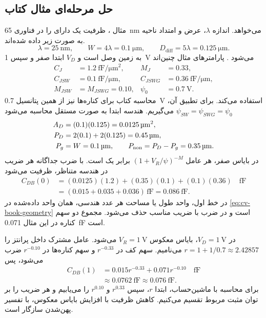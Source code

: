 \subsection{حل مرحله‌ای مثال \texorpdfstring{}{۲.۲} کتاب}
مثال ، ظرفیت  یک  دارای  را
در فناوری \qty{65}{\nano\metre} می‌خواهد. اندازه \(\lambda\)، عرض و امتداد
ناحیه به صورت زیر داده شده‌اند.
\[
 \lambda=\qty{25}{\nano\metre},\qquad
 W=4\lambda=\qty{0.1}{\micro\metre},\qquad
 D_{\mathrm{diff}}=5\lambda=\qty{0.125}{\micro\metre}.
\]
 به زمین وصل است و \(V_D\) ابتدا صفر و سپس \qty{1}{\volt} می‌شود
\cite[صفحه ۷۳]{weste}.
پارامترهای مثال چنین‌اند
\begin{align*}
 C_J&=\qty{1.2}{\femto\farad\per\micro\metre\squared},
 &M_J&=0.33,\\
 C_{JSW}&=\qty{0.1}{\femto\farad\per\micro\metre},
 &C_{JSWG}&=\qty{0.36}{\femto\farad\per\micro\metre},\\
 M_{JSW}&=M_{JSWG}=0.10,
 &\psi_0&=\qty{0.7}{\volt}.
\end{align*}
محاسبه کتاب برای کناره‌ها نیز از همین پتانسیل \qty{0.7}{\volt} استفاده می‌کند.
برای تطبیق آن، \(\psi_{SW}=\psi_{SWG}=\psi_0\) می‌گیریم.
هندسه ابتدا به صورت مستقل محاسبه می‌شود
\begin{align}
 A_D&=(0.1)(0.125)=\qty{0.0125}{\micro\metre\squared},\notag\\
 P_D&=2(0.1)+2(0.125)=\qty{0.45}{\micro\metre},\notag\\
 P_g&=W=\qty{0.1}{\micro\metre},\qquad
 P_{\mathrm{non}}=P_D-P_g=\qty{0.35}{\micro\metre}.
 \label{eq:cv-book-geometry}
\end{align}
در بایاس صفر، هر عامل \((1+V_R/\psi)^{-M}\) برابر یک است. با ضرب جداگانه هر
ضریب در هندسه متناظر، ظرفیت می‌شود
\begin{align*}
 C_{DB}(0)
 &=(0.0125)(1.2)+(0.35)(0.1)+(0.1)(0.36)\quad\unit{\femto\farad}\\
 &=(0.015+0.035+0.036)\,\unit{\femto\farad}
 =\qty{0.086}{\femto\farad}.
\end{align*}
در خط اول، واحد طول یا مساحت هر عدد هندسی، همان واحد داده‌شده در
\eqref{eq:cv-book-geometry} است و در ضرب با ضریب مناسب حذف می‌شود.
مجموع دو سهم کناره در این مثال \qty{0.071}{\femto\farad} است.

در \(V_D=\qty{1}{\volt}\)، بایاس معکوس \(V_R=\qty{1}{\volt}\) می‌شود.
عامل مشترک داخل پرانتز را \(r=1+1/0.7\approx2.42857\) می‌نامیم.
سهم کف در \(r^{-0.33}\) و سهم کناره‌ها در \(r^{-0.10}\) ضرب می‌شود، پس
\begin{align*}
 C_{DB}(1)
 &=0.015r^{-0.33}+0.071r^{-0.10}\quad\unit{\femto\farad}\\
 &\approx\qty{0.0762}{\femto\farad}\approx\qty{0.076}{\femto\farad}.
\end{align*}
برای محاسبه با ماشین‌حساب، ابتدا \(r\)، سپس \(r^{0.33}\) و \(r^{0.10}\)
را می‌یابیم و هر ضریب را بر توان مثبت مربوط تقسیم می‌کنیم.
کاهش ظرفیت با افزایش بایاس معکوس، با تفسیر پهن‌شدن  سازگار است.


